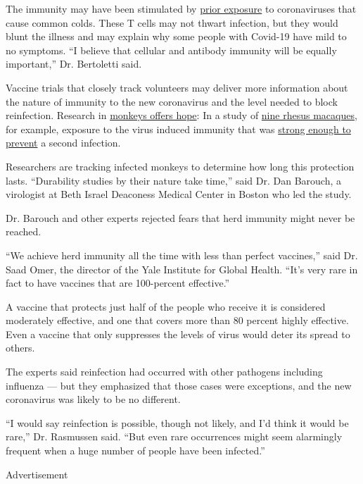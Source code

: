 The immunity may have been stimulated by
\href{https://immunology.sciencemag.org/content/5/48/eabd2071}{prior
exposure} to coronaviruses that cause common colds. These T cells may
not thwart infection, but they would blunt the illness and may explain
why some people with Covid-19 have mild to no symptoms. ``I believe that
cellular and antibody immunity will be equally important,'' Dr.
Bertoletti said.

Vaccine trials that closely track volunteers may deliver more
information about the nature of immunity to the new coronavirus and the
level needed to block reinfection. Research in
\href{https://science.sciencemag.org/content/early/2020/07/01/science.abc5343}{monkeys
offers hope}: In a study of
\href{https://science.sciencemag.org/content/early/2020/05/19/science.abc4776}{nine
rhesus macaques}, for example, exposure to the virus induced immunity
that was
\href{https://www.nytimes3xbfgragh.onion/2020/05/20/health/coronavirus-vaccine-harvard.html}{strong
enough to prevent} a second infection.

Researchers are tracking infected monkeys to determine how long this
protection lasts. ``Durability studies by their nature take time,'' said
Dr. Dan Barouch, a virologist at Beth Israel Deaconess Medical Center in
Boston who led the study.

Dr. Barouch and other experts rejected fears that herd immunity might
never be reached.

``We achieve herd immunity all the time with less than perfect
vaccines,'' said Dr. Saad Omer, the director of the Yale Institute for
Global Health. ``It's very rare in fact to have vaccines that are
100-percent effective.''

A vaccine that protects just half of the people who receive it is
considered moderately effective, and one that covers more than 80
percent highly effective. Even a vaccine that only suppresses the levels
of virus would deter its spread to others.

The experts said reinfection had occurred with other pathogens including
influenza --- but they emphasized that those cases were exceptions, and
the new coronavirus was likely to be no different.

``I would say reinfection is possible, though not likely, and I'd think
it would be rare,'' Dr. Rasmussen said. ``But even rare occurrences
might seem alarmingly frequent when a huge number of people have been
infected.''

Advertisement

